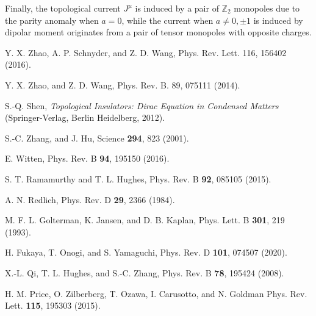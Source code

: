 \documentclass[twocolumn,prl,10pt,superscriptaddress]{revtex4}
\begin{document}
\begin{appendix}
Finally,  the topological current $J^{\mu}$ is induced by a pair of $\mathbb{Z}_2$ monopoles due to the parity anomaly when $a=0$, while the current when $a\neq 0,\pm1$ is induced by dipolar moment originates from a pair of tensor monopoles with opposite charges.


\begin{thebibliography}{99}

 Y. X. Zhao, A. P. Schnyder, and Z. D. Wang, Phys. Rev. Lett. 116, 156402 (2016).

 Y. X. Zhao, and Z. D. Wang, Phys. Rev. B. 89, 075111 (2014).

  S.-Q. Shen, \emph{Topological Insulators: Dirac Equation in Condensed
Matters} (Springer-Verlag, Berlin Heidelberg, 2012).

S.-C. Zhang, and J. Hu, Science \textbf{294}, 823 (2001).

E. Witten,
Phys. Rev. B \textbf{94}, 195150 (2016).

S. T. Ramamurthy and T. L. Hughes,
Phys. Rev. B \textbf{92}, 085105 (2015).

 A. N. Redlich, Phys. Rev. D {\bf 29}, 2366 (1984).


  M. F. L. Golterman, K. Jansen, and D. B. Kaplan, Phys. Lett. B {\bf 301}, 219 (1993).

  H. Fukaya, T. Onogi, and S. Yamaguchi, Phys. Rev. D {\bf 101}, 074507 (2020).



  X.-L. Qi, T. L. Hughes, and S.-C. Zhang, Phys. Rev. B {\bf 78}, 195424 (2008).

  H. M. Price, O. Zilberberg, T. Ozawa, I. Carusotto, and N. Goldman Phys. Rev. Lett. {\bf 115}, 195303 (2015).

\end{thebibliography}


\end{appendix}
\end{document}
